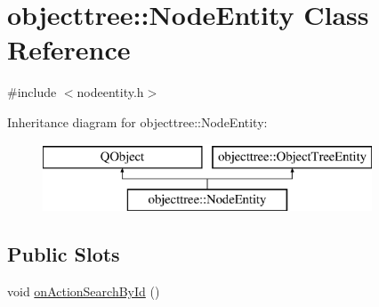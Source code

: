\hypertarget{classobjecttree_1_1_node_entity}{}\section{objecttree\+::Node\+Entity Class Reference}
\label{classobjecttree_1_1_node_entity}


{\ttfamily \#include $<$nodeentity.\+h$>$}

Inheritance diagram for objecttree\+::Node\+Entity\+:\begin{figure}[H]
\begin{center}
\leavevmode
\includegraphics[height=2.000000cm]{d0/d2f/classobjecttree_1_1_node_entity}
\end{center}
\end{figure}
\subsection*{Public Slots}
\begin{DoxyCompactItemize}
\item 
void \mbox{\hyperlink{classobjecttree_1_1_node_entity_a6338fd028cc29a193c11efd0a1ae3e24}{on\+Action\+Search\+By\+Id}} ()
\end{DoxyCompactItemize}
